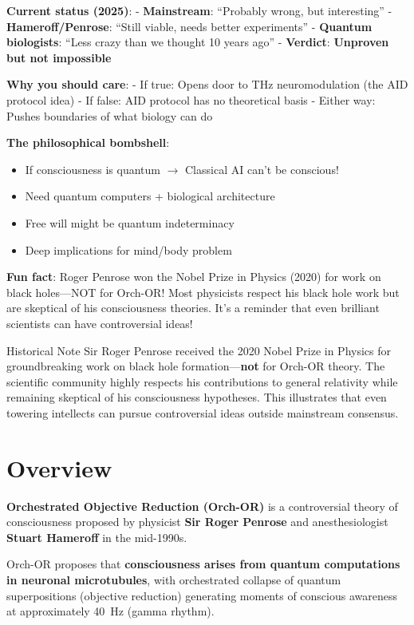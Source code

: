 \begin{nontechnical}
\textbf{Current status (2025)}: - \textbf{Mainstream}: ``Probably wrong,
but interesting'' - \textbf{Hameroff/Penrose}: ``Still viable, needs
better experiments'' - \textbf{Quantum biologists}: ``Less crazy than we
thought 10 years ago'' - \textbf{Verdict}: \textbf{Unproven but not
impossible}

\textbf{Why you should care}: - If true: Opens door to THz
neuromodulation (the AID protocol idea) - If false: AID protocol has no
theoretical basis - Either way: Pushes boundaries of what biology can do

\textbf{The philosophical bombshell}:
\begin{itemize}
\item If consciousness is quantum $\rightarrow$ Classical AI can't be conscious!
\item Need quantum computers + biological architecture
\item Free will might be quantum indeterminacy
\item Deep implications for mind/body problem
\end{itemize}

\textbf{Fun fact}: Roger Penrose won the Nobel Prize in Physics (2020) for work on black holes---NOT for Orch-OR! Most physicists respect his black hole work but are skeptical of his consciousness theories. It's a reminder that even brilliant scientists can have controversial ideas!
\end{nontechnical}

\begin{calloutbox}{Historical Note}
Sir Roger Penrose received the 2020 Nobel Prize in Physics for groundbreaking work on black hole formation---\textbf{not} for Orch-OR theory. The scientific community highly respects his contributions to general relativity while remaining skeptical of his consciousness hypotheses. This illustrates that even towering intellects can pursue controversial ideas outside mainstream consensus.
\end{calloutbox}

\section{Overview}

\textbf{Orchestrated Objective Reduction (Orch-OR)} is a controversial theory of consciousness proposed by physicist \textbf{Sir Roger Penrose} and anesthesiologist \textbf{Stuart Hameroff} in the mid-1990s.

\begin{keyconcept}
Orch-OR proposes that \textbf{consciousness arises from quantum computations in neuronal microtubules}, with orchestrated collapse of quantum superpositions (objective reduction) generating moments of conscious awareness at approximately 40~Hz (gamma rhythm).
\end{keyconcept}

